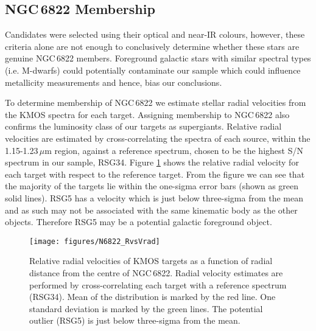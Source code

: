 \documentclass[manuscript]{aastex}
\def\1{\footnotesize I\normalsize}
\def\kms{$\mbox{km s}^{-1}$}
\begin{document}
\subsection{NGC\,6822 Membership} %
\label{sub:membership}
Candidates were selected using their optical and near-IR colours,
however, these criteria alone are not enough to conclusively determine whether these stars are genuine NGC\,6822 members.
Foreground galactic stars with similar spectral types (i.e. M-dwarfs) could potentially contaminate our sample which could influence metallicity measurements and hence, bias our conclusions.

To determine membership of NGC\,6822 we estimate stellar radial velocities from the KMOS spectra for each target.
Assigning membership to NGC\,6822 also confirms the luminosity class of our targets as supergiants.
Relative radial velocities are estimated by cross-correlating the spectra of each source,
within the 1.15-1.23\,$\mu$m region,
against a reference spectrum,
chosen to be the highest S/N spectrum in our sample, RSG34.
Figure
\ref{fig:Vrad} shows the relative radial velocity for each target with respect to the reference target.
From the figure we can see that the majority of the targets lie within the one-sigma error bars
(shown as green solid lines).
RSG5 has a velocity which is just below three-sigma from the mean
and as such may not be associated with the same kinematic body as the other objects.
Therefore RSG5 may be a potential galactic foreground object.





\begin{figure}
 \texttt{[image: figures/N6822\_RvsVrad]}
 \caption{
 Relative radial velocities of KMOS targets as a function of radial distance from the centre of NGC\,6822.
 Radial velocity estimates are performed by cross-correlating each target with a reference spectrum (RSG34).
 Mean of the distribution is marked by the red line.
 One standard deviation is marked by the green lines.
 The potential outlier (RSG5) is just below three-sigma from the mean.
 }
 \label{fig:Vrad}
\end{figure}
\end{document}

